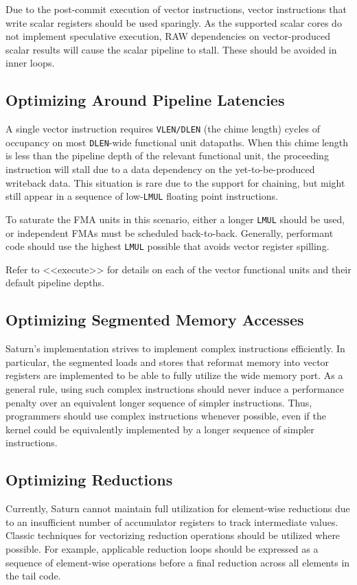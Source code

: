 Due to the post-commit execution of vector instructions, vector instructions that write scalar registers should be used sparingly.
As the supported scalar cores do not implement speculative execution, RAW dependencies on vector-produced scalar results will cause the scalar pipeline to stall.
These should be avoided in inner loops.


\subsection{Optimizing Around Pipeline Latencies}

A single vector instruction requires \texttt{VLEN/DLEN} (the chime length) cycles of occupancy on most \texttt{DLEN}-wide functional unit datapaths.
When this chime length is less than the pipeline depth of the relevant functional unit, the proceeding instruction will stall due to a data dependency on the yet-to-be-produced writeback data.
This situation is rare due to the support for chaining, but might still appear in a sequence of low-\texttt{LMUL} floating point instructions.

To saturate the FMA units in this scenario, either a longer \texttt{LMUL} should be used, or independent FMAs must be scheduled back-to-back.
Generally, performant code should use the highest \texttt{LMUL} possible that avoids vector register spilling.

Refer to <<execute>> for details on each of the vector functional units and their default pipeline depths.


\subsection{Optimizing Segmented Memory Accesses}

Saturn's implementation strives to implement complex instructions efficiently.
In particular, the segmented loads and stores that reformat memory into vector registers are implemented to be able to fully utilize the wide memory port.
As a general rule, using such complex instructions should never induce a performance penalty over an equivalent longer sequence of simpler instructions.
Thus, programmers should use complex instructions whenever possible, even if the kernel could be equivalently implemented by a longer sequence of simpler instructions.


\subsection{Optimizing Reductions}

Currently, Saturn cannot maintain full utilization for element-wise reductions due to an insufficient number of accumulator registers to track intermediate values.
Classic techniques for vectorizing reduction operations should be utilized where possible. 
For example, applicable reduction loops should be expressed as a sequence of element-wise operations before a final reduction across all elements in the tail code.



